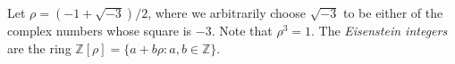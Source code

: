\documentclass[12pt]{article}
\begin{document}
Let $\rho = (-1 + \sqrt{-3})/2$, where we arbitrarily choose $\sqrt{-3}$ to be either of the complex numbers whose square is $-3$. Note that ${\rho}^3=1$. The \emph{Eisenstein integers} are the ring $\mathbb{Z}[ \rho ] = \{ a + b \rho : a , b \in \mathbb{Z} \}$.
\end{document}
